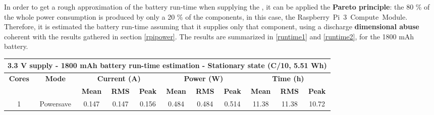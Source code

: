 In order to get a rough approximation of the battery run-time when supplying the , it can be applied the \textbf{Pareto principle}: the 80 \% of the whole power consumption is produced by only a 20 \% of the components, in this case, the Raspberry~Pi~3~Compute~Module. Therefore, it is estimated the battery run-time assuming that it supplies only that component, using a discharge \textbf{dimensional abuse} coherent with the results gathered in section \ref{rpipower}. The results are summarized in \autoref{runtime1} and \autoref{runtime2}, for the 1800 mAh battery.

\begin{table}[H]
\centering
\begin{tabular}{ccccccccccc}
\multicolumn{11}{c}{\textbf{3.3 V supply - 1800 mAh battery run-time estimation - Stationary state (C/10, 5.51 Wh)}}                                                                                                                                                                                                                                                                         \\ \hline
\textbf{Cores}         & \textbf{Mode}                    & \multicolumn{3}{c}{\textbf{Current (A)}}                                                                  & \multicolumn{3}{c}{\textbf{Power (W)}}                                                                    & \multicolumn{3}{c}{\textbf{Time (h)}}                                                                    \\ \hline
\textbf{}              & \textbf{}                        & \textbf{Mean}             & \textbf{RMS}              & \textbf{Peak}                                     & \textbf{Mean}             & \textbf{RMS}              & \textbf{Peak}                                     & \textbf{Mean}             & \textbf{RMS}              & \textbf{Peak}                                    \\ \cline{3-11} 
\multicolumn{1}{c|}{1} & Powersave                        & 0.147                     & 0.147                     & \multicolumn{1}{c|}{{\color[HTML]{FE0000} 0.156}} & 0.484                     & 0.484                     & \multicolumn{1}{c|}{{\color[HTML]{FE0000} 0.514}} & 11.38                     & 11.38                     & {\color[HTML]{FE0000} 10.72}                     \\

\end{tabular}
\end{table}
